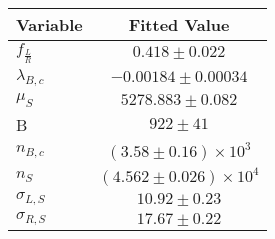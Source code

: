 \begin{tabular}[t]{lc}
\hline
Variable &Fitted Value\\
\hline\hline
$f_{\frac{L}{R}}$&$0.418\pm0.022$\\
\hline
$\lambda_{B,c}$&$-0.00184\pm0.00034$\\
\hline
$\mu_S$&$5278.883\pm0.082$\\
\hline
B&$922\pm41$\\
\hline
$n_{B,c}$&$(3.58\pm0.16)\times 10^3$\\
\hline
$n_S$&$(4.562\pm0.026)\times 10^4$\\
\hline
$\sigma_{L, S}$&$10.92\pm0.23$\\
\hline
$\sigma_{R, S}$&$17.67\pm0.22$\\
\hline
\end{tabular}